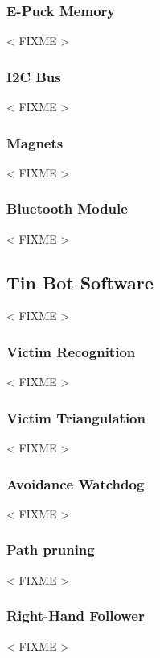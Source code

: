 \documentclass[a4paper,parskip,headheight=38pt]{scrartcl} %
\newcommand{\incomplete}[1]{\textless{} #1 \textgreater{}}
\begin{document}
\subsubsection{E-Puck Memory}
\incomplete{FIXME}

\subsubsection{I2C Bus}
\incomplete{FIXME}

\subsubsection{Magnets}
\incomplete{FIXME}

\subsubsection{Bluetooth Module}
\incomplete{FIXME}

\subsection{Tin Bot Software}
\incomplete{FIXME}

\subsubsection{Victim Recognition}
\incomplete{FIXME}

\subsubsection{Victim Triangulation}
\incomplete{FIXME}

\subsubsection{Avoidance Watchdog}
\incomplete{FIXME}

\subsubsection{Path pruning}
\incomplete{FIXME}


\subsubsection{Right-Hand Follower} %
\incomplete{FIXME}
\end{document}
